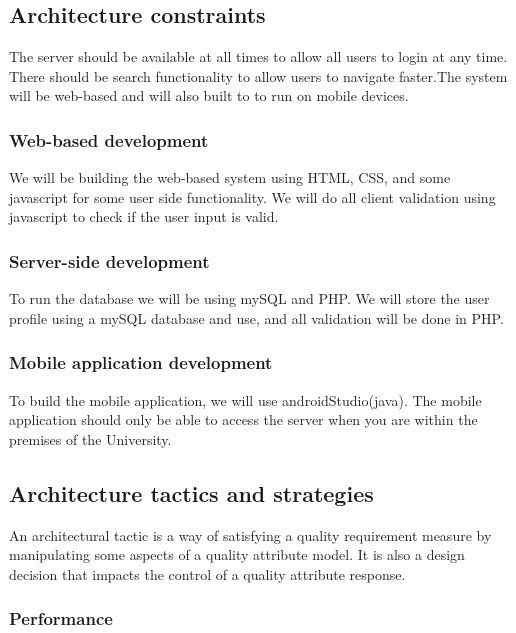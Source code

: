 \documentclass[a4paper,12pt]{report}
\begin{document}
\subsection{Architecture constraints}

The server should be available at all times to allow all users to login at any time. There should be search functionality to allow users to navigate faster.The system will be web-based and will also built to to run on mobile devices.

\subsubsection{Web-based development}

We will be building the web-based system using HTML, CSS, and some javascript for some user side functionality. We will do all client validation using javascript to check if the user input is valid.  

\subsubsection{Server-side development}

To run the database we will be using mySQL and PHP. We will store the user profile using a mySQL database and use, and all validation will be done in PHP.


\subsubsection{Mobile application development}

To build the mobile application, we will use androidStudio(java). The mobile application should only be able to access the server when you are within the premises of the University.


\subsection{Architecture tactics and strategies}

An architectural tactic is a way of satisfying a quality requirement measure by manipulating some aspects of a quality attribute model. It is also a design decision that impacts the control of a quality attribute response.

\subsubsection{Performance}
\end{document}
